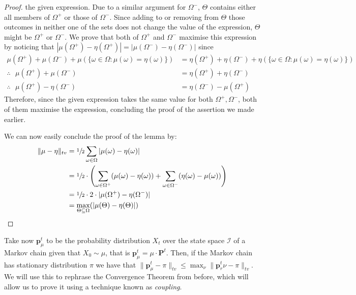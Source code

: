 \begin{proof}
		the given expression. Due to a similar argument for $\Omega^-$, $\Theta$ contains 
		either all members of $\Omega^+$ or those of $\Omega^-$. Since adding to or removing 
		from $\Theta$ those outcomes in neither one of the sets does not change the value of 
		the expression, $\Theta$ might be $\Omega^+$ or $\Omega^-$. We prove that both of
		$\Omega^+$ and $\Omega^-$ maximise this expression by noticing that 
		$|\mu(\Omega^+) - \eta(\Omega^+)| = |\mu(\Omega^-) - \eta(\Omega^-)|$ since
		\begin{align*}
			\mu(\Omega^+)+\mu(\Omega^-)+\mu(\{\omega\in\Omega:\mu(\omega)=\eta(\omega)\})
			&= \eta(\Omega^+)+\eta(\Omega^-)+\eta(\{\omega\in\Omega:\mu(\omega)=
			\eta(\omega)\})\\
			\therefore\ \ \ 
			\mu(\Omega^+)+\mu(\Omega^-)&= \eta(\Omega^+)+\eta(\Omega^-)\\
			\therefore\ \ \ 
			\mu(\Omega^+) - \eta(\Omega^-)&= \eta(\Omega^-) - \mu(\Omega^+)
		\end{align*}
		Therefore, since the given expression takes the same value for both $\Omega^+,
		\Omega^-$, both of them maximise the expression, concluding the proof of the 
		assertion we made earlier. \par
		We can now easily conclude the proof of the lemma by:
		\begin{align*}
			\|\mu-\eta\|_{tv} &=\sfrac{1}{2}\sum_{\omega \in \Omega}|\mu(\omega)-
			\eta(\omega)|\\
			&= \sfrac{1}{2} \cdot \left(\sum_{\omega\in\Omega^+}(\mu(\omega) - 
			\eta(\omega)) + \sum_{\omega\in\Omega^-}(\eta(\omega) -\mu(\omega))\right)\\
			&= \sfrac{1}{2} \cdot 2 \cdot |\mu(\Omega^+) - \eta(\Omega^-)| \\
			&= \max_{\Theta \subseteq \Omega}(|\mu(\Theta)-\eta(\Theta)|)
		\end{align*}
	\end{proof}
	
	Take now $\mathbf{p}^t_\mu$ to be the probability distribution $X_t$ over the state space 
	$\mathcal{I}$ of a Markov chain given that $X_0 \sim \mu$, that is $\mathbf{p}^t_\mu = 
	\mu \cdot \mathbf{P}^t$. Then, if the Markov chain has stationary distribution $\pi$ we 
	have that $\|\mathbf{p}^t_\mu - \pi\|_{tv} \leq \max_{\nu}\|\mathbf{p}^t_r\nu 
	- \pi\|_{tv}$. We will use this to rephrase the Convergence Theorem from before, which will 
	allow us to prove it using a technique known as \emph{coupling}.

